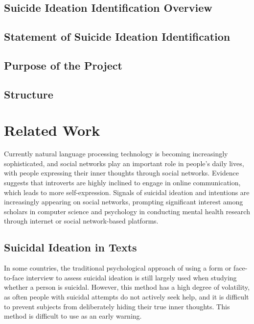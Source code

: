 \documentclass[ %
                    author={Louis Wang},
                supervisor={Dr. Qiang Liu},
                    degree={MSc},
                     title={Identification of Suicide Ideation in Texts},
                      type={},
                      year={2024}]{dissertation}
\begin{document}

\section{Suicide Ideation Identification Overview}

\section{Statement of Suicide Ideation Identification}

\section{Purpose of the Project}

\section{Structure}



\chapter{Related Work}
\label{chap:background}

\noindent
Currently natural language processing technology is becoming increasingly sophisticated, and social networks play an important role in people's daily lives, with people expressing their inner thoughts through social networks. 
Evidence suggests that introverts are highly inclined to engage in online communication, which leads to more self-expression. Signals of suicidal ideation and intentions are increasingly appearing on social networks, prompting significant interest among scholars in computer science and psychology in conducting mental health research through internet or social network-based platforms.

\section{Suicidal Ideation in Texts}
\noindent
In some countries, the traditional psychological approach of using a form or face-to-face interview to assess suicidal ideation is still largely used when studying whether a person is suicidal. However, this method has a high degree of volatility, as often people with suicidal attempts do not actively seek help, and it is difficult to prevent subjects from deliberately hiding their true inner thoughts. This method is difficult to use as an early warning.
\end{document}
